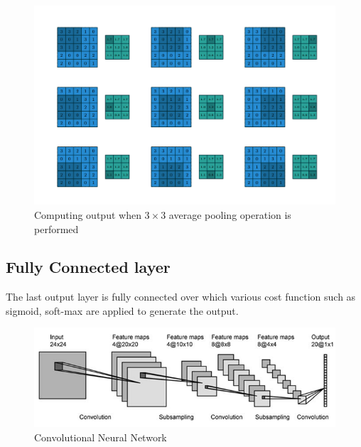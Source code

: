 \begin{figure}[H]
  \centering
    \includegraphics[scale=.3, angle=0]{Files/Pooling.png}
    \caption[Pooling Operation]{Computing output when $3 \times 3$ average pooling operation is performed \cite{1603.07285}}
    \label{fig:Pooling}
\end{figure}

\subsection{Fully Connected layer}
The last output layer is fully connected  over which various cost function such as sigmoid, soft-max are applied to generate the output.


\begin{figure}[H]
  \centering
    \includegraphics[scale=.6, angle=0]{Files/cnn-2.png}
    \caption[Convolutional Neural Network]{Convolutional Neural Network}
    \label{fig:CNN}
\end{figure}